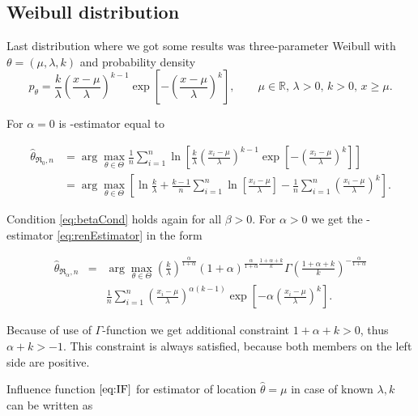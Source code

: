 \subsection{Weibull distribution} 

Last distribution where we got some results was three-parameter Weibull with $\theta = (\mu,\lambda,k)$ and probability density
\begin{equation}
	p_\theta =  \frac{k}{\lambda} \left( \frac{x-\mu}{\lambda} \right)^{k-1} \exp \left[ -\left( \frac{x-\mu}{\lambda} \right)^k \right], \qquad \mu \in \mathbb{R}, \, \lambda>0, \, k>0, \, x \geq \mu.
\end{equation}

\noindent For $\alpha = 0$ is \mRa-estimator equal to

\begin{align}
	\hat{\theta}_{\mathfrak{R}_0,n} & = \arg \max_{\theta \in \Theta} \frac{1}{n} \sum^n_{i=1} \ln \left[ \frac{k}{\lambda} \left( \frac{x_i-\mu}{\lambda} \right)^{k-1} 
	\exp \left[ -\left( \frac{x_i-\mu}{\lambda} \right)^k \right]\right] \nonumber \\
	&=\arg \max_{\theta \in \Theta}\left[ \ln \frac{k}{\lambda} + \frac{k-1}{n} \sum^n_{i=1} \ln \left[  \frac{x_i-\mu}{\lambda} \right] - 
	\frac{1}{n} \sum^n_{i=1} \left(  \frac{x_i-\mu}{\lambda} \right)^k \right].
\end{align}

\noindent Condition \ref{eq:betaCond} holds again for all $\beta>0$. For $\alpha>0$ we get the \mRa-estimator \eqref{eq:renEstimator} in the form

\begin{eqnarray}
	\hat{\theta}_{\mathfrak{R}_\alpha,n} & = & \arg \max_{\theta \in \Theta} \left( \frac{k}{\lambda} \right)^\frac{\alpha}{1+\alpha} (1+\alpha)^{\frac{\alpha}{1+\alpha}\frac{1+\alpha+k}{k}} 
	\Gamma\left(\frac{1+\alpha+k}{k}\right)^{-\frac{\alpha}{1+\alpha}} \nonumber \\
	&& \frac{1}{n}\sum_{i=1}^n \left( \frac{x_i-\mu}{\lambda}\right)^{\alpha(k-1)} \exp\left[-\alpha \left(\frac{x_i-\mu}{\lambda}\right)^k\right].
\end{eqnarray}

\noindent Because of use of $\Gamma$-function we get additional constraint  $1+\alpha+k>0$, thus $\alpha + k > -1$. This constraint is always satisfied, because both members on the left side are positive.

Influence function $\eqref{eq:IF}$ for estimator of location $\hat{\theta} = \mu$ in case of known $\lambda, k $  can be written as


